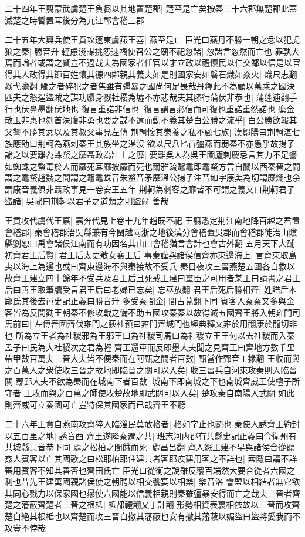 二十四年王翦蒙武虜楚王負芻以其地置楚郡|{
	楚至是亡矣按秦三十六郡無楚郡此蓋滅楚之時暫置耳後分為九江鄣會稽三郡}


二十五年大興兵使王賁攻遼東虜燕王喜|{
	燕至是亡}
臣光曰燕丹不勝一朝之忿以犯虎狼之秦|{
	勝音升}
輕慮淺謀挑怨速禍使召公之廟不祀忽諸|{
	忽諸言忽然而亡也}
罪孰大焉而論者或謂之賢豈不過哉夫為國家者任官以才立政以禮懷民以仁交鄰以信是以官得其人政得其節百姓懷其德四鄰親其義夫如是則國家安如磐石熾如焱火|{
	熾尺志翻焱弋瞻翻}
觸之者碎犯之者焦雖有彊暴之國尚何足畏哉丹釋此不為顧以萬乘之國決匹夫之怒逞盜賊之謀功隳身戮社稷為墟不亦悲哉夫其膝行蒲伏非恭也|{
	蒲蓬逋翻手行也伏鼻墨翻伏地也}
復言重諾非信也|{
	復言謂言必信而可復也重諾重然諾也}
糜金散玉非惠也刎首決腹非勇也要之謀不遠而動不義其楚白公勝之流乎|{
	白公勝欲報其父讐不勝其忿以及其叔父事見左傳}
荆軻懷其豢養之私不顧七族|{
	漢鄒陽曰荆軻湛七族應劭曰荆軻為燕刺秦王其族坐之湛沒}
欲以尺八匕首彊燕而弱秦不亦愚乎故揚子論之以要離為蛛蝥之靡聶政為壯士之靡|{
	要離吳人為吳王闔廬刺慶忌言其力不足譬如蜘蛛之螫毒於人而靡死耳靡披靡而死也爾雅疏鼅鼄即鼄蝥方言自關以西秦晉之間謂之鼄蝥趙魏之間謂之鼅鼄蛛音朱蝥音矛靡溫公揚子注音如字康美為切謂糜爛也余謂康音義俱非聶政事見一卷安王五年}
荆軻為刺客之靡皆不可謂之義又曰荆軻君子盜諸|{
	吳祕曰荆軻以君子之道類之則盜爾}
善哉

王賁攻代虜代王嘉|{
	嘉奔代見上卷十九年趙既不祀}
王翦悉定荆江南地降百越之君置會稽郡|{
	秦會稽郡治吳縣兼有今閩越兩浙之地後漢分會稽置吳郡而會稽郡徙治山隂縣劉恕曰禹會諸侯江南而有功因名其山曰會稽猶言會計也會古外翻}
五月天下大酺　初齊君王后賢|{
	君王后太史敫女襄王后}
事秦謹與諸侯信齊亦東邊海上|{
	言齊東取島夷以海上為邊也或曰齊東邊海不與秦接故不受兵}
秦日夜攻三晉燕楚五國各自救以故齊王建立四十餘年不受兵及君王后且死戒王建曰羣臣之可用者某王曰請書之君王后曰善王取筆牘受言君王后曰老婦已忘矣|{
	忘巫放翻}
君王后死后勝相齊|{
	姓譜后本郈氏其後去邑史記正義曰勝音升}
多受秦間金|{
	間古莧翻下同}
賓客入秦秦又多與金客皆為反間勸王朝秦不修攻戰之備不助五國攻秦秦以故得滅五國齊王將入朝雍門司馬前曰|{
	左傳晉圍齊伐雍門之荻杜預曰雍門齊城門也經典釋文雍於用翻康於龍切非也}
所為立王者為社稷邪為王邪王曰為社稷司馬曰為社稷立王王何以去社稷而入秦|{
	孟子曰民為大社稷次之君為輕}
齊王還車而反即墨大夫聞之見齊王曰齊地方數千里帶甲數百萬夫三晉大夫皆不便秦而在阿甄之間者百數|{
	甄當作鄄音工掾翻}
王收而與之百萬人之衆使收三晉之故地即臨晉之關可以入矣|{
	收三晉兵自河東攻秦則入臨晉關}
鄢郢大夫不欲為秦而在城南下者百數|{
	城南下即南城之下也南城齊威王使檀子所守者}
王收而與之百萬之師使收楚故地即武關可以入矣|{
	楚攻秦自南陽入武關}
如此則齊威可立秦國可亡豈特保其國家而已哉齊王不聽

二十六年王賁自燕南攻齊猝入臨淄民莫敢格者|{
	格如字止也鬬也}
秦使人誘齊王約封以五百里之地|{
	誘音酉}
齊王遂降秦遷之共|{
	班志河内郡冇共縣史記正義曰今衛州有共城縣共音恭下同}
處之松柏之間餓而死|{
	處昌呂翻}
齊人怨王建不早與諸侯合從聽姦人賓客以亡其國歌之曰松耶柏耶住建共者客耶疾建用客之不詳也|{
	索隱曰謂不詳審用賓客不知其善否也齊田氏亡}
臣光曰從衡之說雖反覆百端然大要合從者六國之利也昔先王建萬國親諸侯使之朝聘以相交饗宴以相樂|{
	樂音洛}
會盟以相結者無它欲其同心戮力以保家國也曏使六國能以信義相親則秦雖彊暴安得而亡之哉夫三晉者齊楚之藩蔽齊楚者三晉之根柢|{
	柢都禮翻乂丁計翻}
形勢相資表裏相依故以三晉而攻齊楚自絶其根柢也以齊楚而攻三晉自撤其藩蔽也安有撤其藩蔽以媚盜曰盜將愛我而不攻豈不悖哉

